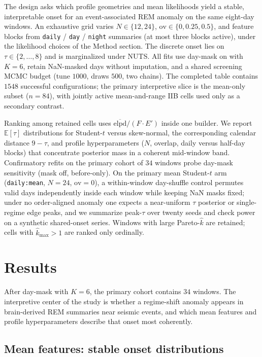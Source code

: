 The design asks which profile geometries and mean likelihoods yield a stable, interpretable onset for an event-associated REM anomaly on the same eight-day windows. An exhaustive grid varies \(N\in\{12,24\}\), \(\mathrm{ov}\in\{0,0.25,0.5\}\), and feature blocks from \texttt{daily} / \texttt{day} / \texttt{night} summaries (at most three blocks active), under the likelihood choices of the Method section. The discrete onset lies on \(\tau\in\{2,\ldots,8\}\) and is marginalized under NUTS. All fits use day-mask on with \(K=6\), retain NaN-masked days without imputation, and a shared screening MCMC budget (tune \(1000\), draws \(500\), two chains). The completed table contains \(1548\) successful configurations; the primary interpretive slice is the mean-only subset (\(n=84\)), with jointly active mean-and-range IIB cells used only as a secondary contrast.

Ranking among retained cells uses \(\overline{\mathrm{elpd}}/(F\cdot E')\) inside one builder. We report \(\mathbb{E}[\tau]\) distributions for Student-\(t\) versus skew-normal, the corresponding calendar distance \(9-\tau\), and profile hyperparameters (\(N\), overlap, daily versus half-day blocks) that concentrate posterior mass in a coherent mid-window band. Confirmatory refits on the primary cohort of \(34\) windows probe day-mask sensitivity (mask off, before-only). On the primary mean Student-\(t\) arm (\texttt{daily:mean}, \(N=24\), \(\mathrm{ov}=0\)), a within-window day-shuffle control permutes valid days independently inside each window while keeping NaN masks fixed; under no order-aligned anomaly one expects a near-uniform \(\tau\) posterior or single-regime edge peaks, and we summarize peak-\(\tau\) over twenty seeds and check power on a synthetic shared-onset series. Windows with large Pareto-\(\hat k\) are retained; cells with \(\hat k_{\max}>1\) are ranked only ordinally.

\section{Results}

After day-mask with \(K=6\), the primary cohort contains \(34\) windows. The interpretive center of the study is whether a regime-shift anomaly appears in brain-derived REM summaries near seismic events, and which mean features and profile hyperparameters describe that onset most coherently.

\subsection{Mean features: stable onset distributions}

